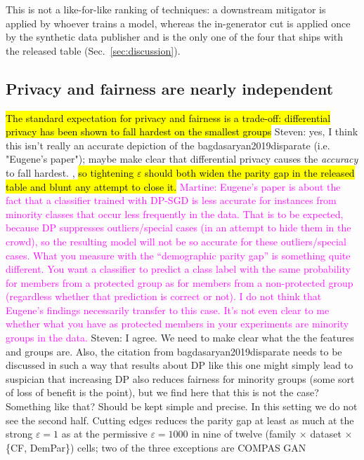 \documentclass{article}
\newcommand{\martine}[1]{\textcolor{magenta}{Martine: #1}}
\newcommand{\s}[1]{\textcolor{Dandelion}{Steven: #1}}
\begin{document}
This is not a like-for-like ranking of techniques: a downstream mitigator is
applied by whoever trains a model, whereas the in-generator cut is applied once
by the synthetic data publisher and is the only one of the four that ships with the released
table (Sec.~\ref{sec:discussion}).

\subsection{Privacy and fairness are nearly independent}

\hl{The standard expectation for privacy and fairness is a trade-off:
differential privacy has been shown to fall hardest on the smallest groups} \s{yes, I think this isn't really an accurate depiction of the bagdasaryan2019disparate (i.e. "Eugene's paper"); maybe make clear that differential privacy causes the \textit{accuracy} to fall hardest.}
\citep{bagdasaryan2019disparate}, \hl{so tightening $\varepsilon$ should both
widen the parity gap in the released table and blunt any attempt to close
it.} \martine{Eugene's paper is about the fact that a classifier trained with DP-SGD is less accurate for instances from minority classes that occur less frequently in the data. That is to be expected, because DP suppresses outliers/special cases (in an attempt to hide them in the crowd), so the resulting model will not be so accurate for these outliers/special cases. What you measure with the ``demographic parity gap'' is something quite different. You want a classifier to predict a class label with the same probability for members from a protected group as for members from a non-protected group (regardless whether that prediction is correct or not). I do not think that Eugene's findings necessarily transfer to this case. It's not even clear to me whether what you have as protected members in your experiments are minority groups in the data.} \s{I agree. We need to make clear what the the features and groups are. Also, the citation from bagdasaryan2019disparate needs to be discussed in such a way that results about DP like this one might simply lead to suspician that increasing DP also reduces fairness for minority groups (some sort of loss of benefit is the point), but we find here that this is not the case? Something like that? Should be kept simple and precise. } In this setting we do not see the second half. Cutting edges reduces
the parity gap at least as much at the strong $\varepsilon{=}1$ as at the
permissive $\varepsilon{=}1000$ in nine of twelve (family $\times$ dataset
$\times$ \{CF, DemPar\}) cells; two of the three exceptions are COMPAS GAN
\end{document}
